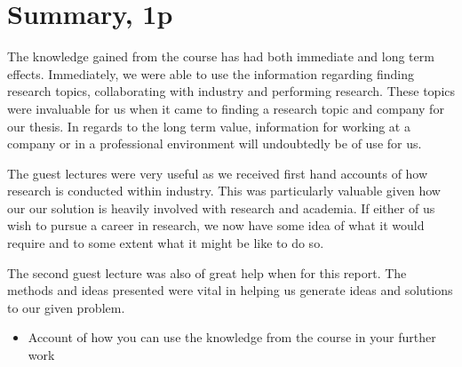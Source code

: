\documentclass{article}
\begin{document}
\section{Summary, 1p}

The knowledge gained from the course has had both immediate and long term effects. Immediately, we were able to use the information regarding finding research topics, collaborating with industry and performing research. These topics were invaluable for us when it came to finding a research topic and company for our thesis. In regards to the long term value, information for working at a company or in a professional environment will undoubtedly be of use for us. 

The guest lectures were very useful as we received first hand accounts of how research is conducted within industry. This was particularly valuable given how our our solution is heavily involved with research and academia. If either of us wish to pursue a career in research, we now have some idea of what it would require and to some extent what it might be like to do so.

The second guest lecture was also of great help when for this report. The methods and ideas presented were vital in helping us generate ideas and solutions to our given problem.

\begin{itemize}
	\item Account of how you can use the knowledge from the course in your further work
\end{itemize}




\end{document}
